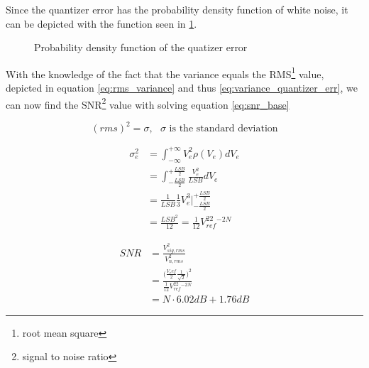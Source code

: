 \documentclass[10pt,landscape]{article}
\begin{document}
\begin{multicols}{2}
Since the quantizer error has the probability density function of white noise, it can be depicted with the function seen in \ref{fig:prob_dens_func_quantizer}.

\begin{figure}[H]
    \centering
    \caption{Probability density function of the quatizer error}
    \label{fig:prob_dens_func_quantizer}
\end{figure}

With the knowledge of the fact that the variance equals the RMS\footnote{root mean square} value, depicted in equation \ref{eq:rms_variance} and thus \ref{eq:variance_quantizer_err}, we can now find the SNR\footnote{signal to noise ratio} value with solving equation \ref{eq:snr_base}

\begin{equation}
    (rms)^2 = \sigma,\text{ $\sigma$ is the standard deviation}
    \label{eq:rms_variance}
\end{equation}

\begin{eqnarray}
    \sigma_e^2 &= \int_{-\infty}^{+\infty}V_e^2\rho(V_e)dV_e \\
    &= \int_{-\frac{LSB}{2}}^{+\frac{LSB}{2}}\frac{V_e^2}{LSB}dV_e \\
    &= \frac{1}{LSB}\frac{1}{3}V_e^3\Big|_{-\frac{LSB}{2}}^{+\frac{LSB}{2}} \\
    &= \frac{LSB^2}{12} = \frac{1}{12}V_{ref}^22^{-2N}
    \label{eq:variance_quantizer_err}
\end{eqnarray}

\begin{eqnarray}
    SNR &= \frac{V_{sig, rms}^2}{V_{n, rms}^2} \\
    &= \frac{\Big(\frac{V_ref}{2}\frac{1}{\sqrt{2}}\Big)^2}{\frac{1}{12}V_{ref}^22^{-2N}} \\
    &= N\cdot 6.02dB + 1.76dB
    \label{eq:snr_base}
\end{eqnarray}


\end{multicols}
\end{document}
